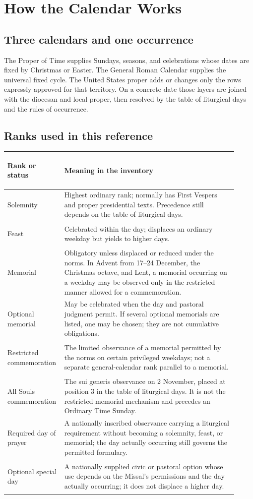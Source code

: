 \section{How the Calendar Works}

\subsection{Three calendars and one occurrence}

The Proper of Time supplies Sundays, seasons, and celebrations whose dates are fixed by Christmas or Easter. The General Roman Calendar supplies the universal fixed cycle. The United States proper adds or changes only the rows expressly approved for that territory. On a concrete date those layers are joined with the diocesan and local proper, then resolved by the table of liturgical days and the rules of occurrence.

\subsection{Ranks used in this reference}

\begin{longtable}{>{\bfseries\raggedright\arraybackslash}p{0.19\linewidth}>{\raggedright\arraybackslash}p{0.73\linewidth}}
\toprule
Rank or status & Meaning in the inventory\\
\midrule
\endhead
Solemnity & Highest ordinary rank; normally has First Vespers and proper presidential texts. Precedence still depends on the table of liturgical days.\\
Feast & Celebrated within the day; displaces an ordinary weekday but yields to higher days.\\
Memorial & Obligatory unless displaced or reduced under the norms. In Advent from 17--24 December, the Christmas octave, and Lent, a memorial occurring on a weekday may be observed only in the restricted manner allowed for a commemoration.\\
Optional memorial & May be celebrated when the day and pastoral judgment permit. If several optional memorials are listed, one may be chosen; they are not cumulative obligations.\\
Restricted commemoration & The limited observance of a memorial permitted by the norms on certain privileged weekdays; not a separate general-calendar rank parallel to a memorial.\\
All Souls commemoration & The sui generis observance on 2 November, placed at position 3 in the table of liturgical days. It is not the restricted memorial mechanism and precedes an Ordinary Time Sunday.\\
Required day of prayer & A nationally inscribed observance carrying a liturgical requirement without becoming a solemnity, feast, or memorial; the day actually occurring still governs the permitted formulary.\\
Optional special day & A nationally supplied civic or pastoral option whose use depends on the Missal's permissions and the day actually occurring; it does not displace a higher day.\\
\bottomrule
\end{longtable}

